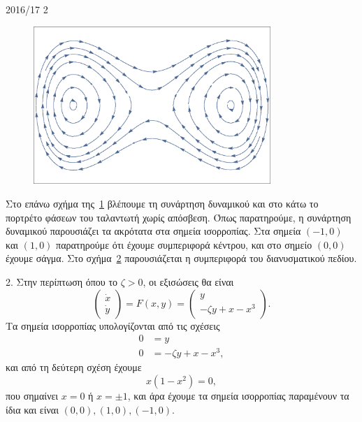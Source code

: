 \begin{solution}{2016/17 2}
\begin{figure}[h!]
\begin{subfigure}[b]{0.8\textwidth}
        \end{subfigure}
        \caption{}
        \label{fig:ex2_undampedDuffing}
    \end{figure}
    \begin{figure}[h]
        \centering
        \includegraphics[width=0.8\textwidth]{figures/ex2_undampedDuffingVectorField.eps}
        \caption{}
        \label{fig:ex2_undampedDuffingVectorField}
    \end{figure}
    Στο επάνω σχήμα της~\ref{fig:ex2_undampedDuffing} βλέπουμε τη συνάρτηση
    δυναμικού και στο κάτω το πορτρέτο φάσεων του ταλαντωτή  χωρίς
    απόσβεση. Όπως παρατηρούμε, η συνάρτηση δυναμικού παρουσιάζει τα ακρότατα
    στα σημεία ισορροπίας. Στα σημεία \( (-1, 0) \) και \( (1, 0) \) παρατηρούμε
    ότι έχουμε συμπεριφορά κέντρου, και στο σημείο \( (0, 0) \) έχουμε σάγμα.
    Στο σχήμα~\ref{fig:ex2_undampedDuffingVectorField} παρουσιάζεται η
    συμπεριφορά του διανυσματικού πεδίου.

    2. Στην περίπτωση όπου το \( \zeta > 0 \), οι εξισώσεις θα είναι
    \begin{equation*}
        \begin{pmatrix}
            \dot{x} \\
            \dot{y}
        \end{pmatrix} = F(x, y) =
        \begin{pmatrix}
            y \\
            -\zeta y + x - x^3
        \end{pmatrix}.
    \end{equation*}
    Τα σημεία ισορροπίας υπολογίζονται από τις σχέσεις
    \begin{align*}
        0 &= y \\
        0 &= -\zeta y + x - x^3,
    \end{align*}
    και από τη δεύτερη σχέση έχουμε
    \begin{equation*}
        x(1 - x^2) = 0,
    \end{equation*}
    που σημαίνει \( x = 0 \) ή \( x = \pm 1 \), και άρα έχουμε τα σημεία
    ισορροπίας παραμένουν τα ίδια και είναι \( (0, 0), (1, 0), (-1, 0) \).


\end{solution}
